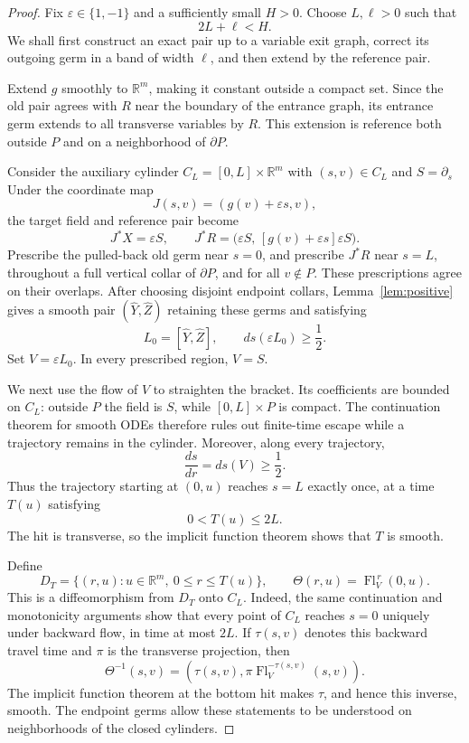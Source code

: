 \documentclass[10pt,a4paper]{amsart}
\begin{document}
\begin{proof}
Fix $\varepsilon\in\{1,-1\}$ and a sufficiently small $H>0$. Choose $L,\ell>0$ such that
$$
    2L+\ell<H.
$$
We shall first construct an exact pair up to a variable exit graph, correct its outgoing germ in a band of width $\ell$, and then extend by the reference pair.

Extend $g$ smoothly to $\mathbb R^m$, making it constant outside a compact set. Since the old pair agrees with $R$ near the boundary of the entrance graph, its entrance germ extends to all transverse variables by $R$. This extension is reference both outside $P$ and on a neighborhood of $\partial P$.

Consider the auxiliary cylinder $C_L=[0,L]\times\mathbb R^m$ with $(s,v)\in C_L$ and $S=\partial_s$ Under the coordinate map
$$
    J(s,v)=(g(v)+\varepsilon s,v),
$$
the target field and reference pair become
$$
    J^*X=\varepsilon S,
    \qquad
    J^*R=
    \bigl(\varepsilon S,\,[g(v)+\varepsilon s]\varepsilon S\bigr).
$$
Prescribe the pulled-back old germ near $s=0$, and prescribe $J^*R$ near $s=L$, throughout a full vertical collar of $\partial P$, and for all $v\notin P$. These prescriptions agree on their overlaps. After choosing disjoint endpoint collars, Lemma~\ref{lem:positive} gives a smooth pair $(\widehat Y,\widehat Z)$ retaining these germs
and satisfying
$$
    L_0=[\widehat Y,\widehat Z],
    \qquad
    ds(\varepsilon L_0)\ge\frac12.
$$
Set $V=\varepsilon L_0$. In every prescribed region, $V=S$.

We next use the flow of $V$ to straighten the bracket. Its coefficients are bounded on $C_L$: outside $P$ the field is $S$, while $[0,L]\times P$ is compact. The continuation theorem for smooth ODEs therefore rules out finite-time escape while a trajectory remains in the cylinder. Moreover, along every trajectory,
$$
    \frac{ds}{dr}=ds(V)\ge\frac12.
$$
Thus the trajectory starting at $(0,u)$ reaches $s=L$ exactly once, at a time $T(u)$ satisfying
$$
    0<T(u)\le 2L.
$$
The hit is transverse, so the implicit function theorem shows that $T$ is smooth.

Define
$$
    D_T=
    \{(r,u):u\in\mathbb R^m,\ 0\le r\le T(u)\},
    \qquad
    \Theta(r,u)=\operatorname{Fl}_V^{\,r}(0,u).
$$
This is a diffeomorphism from $D_T$ onto $C_L$. Indeed, the same continuation and monotonicity arguments show that every point of $C_L$ reaches $s=0$ uniquely under backward flow, in time at most $2L$. If $\tau(s,v)$ denotes this backward travel time and $\pi$
is the transverse projection, then
$$
    \Theta^{-1}(s,v)
    =
    \left(
        \tau(s,v),
        \pi\operatorname{Fl}_V^{-\tau(s,v)}(s,v)
    \right).
$$
The implicit function theorem at the bottom hit makes $\tau$, and hence this inverse, smooth. The endpoint germs allow these statements to be understood on neighborhoods of the closed cylinders.


\end{proof}
\end{document}
